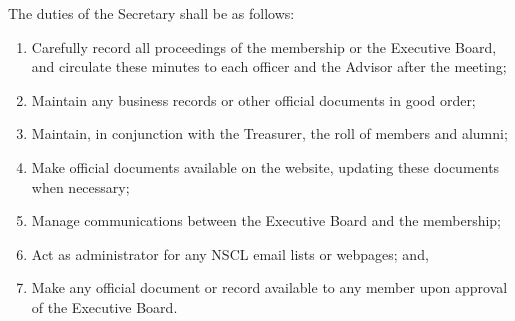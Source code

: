 \documentclass{bylaws}
\newcommand{\NSCL}{\textsc{NSCL}\xspace}
\begin{document}
\begin{linenumbers}[1]
\begin{enumerate}
    \sub[Secretary] The duties of the Secretary shall be as follows:
    \begin{enumerate}
    \item Carefully record all proceedings of the membership or the
      Executive Board, and circulate these minutes to each officer and
      the Advisor after the meeting;
    \item Maintain any business records or other official documents in
      good order;
    \item Maintain, in conjunction with the Treasurer, the roll of
      members and alumni;
    \item Make official documents available on the website, updating
      these documents when necessary;
    \item Manage communications between the Executive Board and the
      membership;
    \item Act as administrator for any \NSCL email lists or webpages;
      and,
    \item Make any official document or record available to any member
      upon approval of the Executive Board.
    \end{enumerate}
    

\end{enumerate}
\end{linenumbers}
\end{document}
